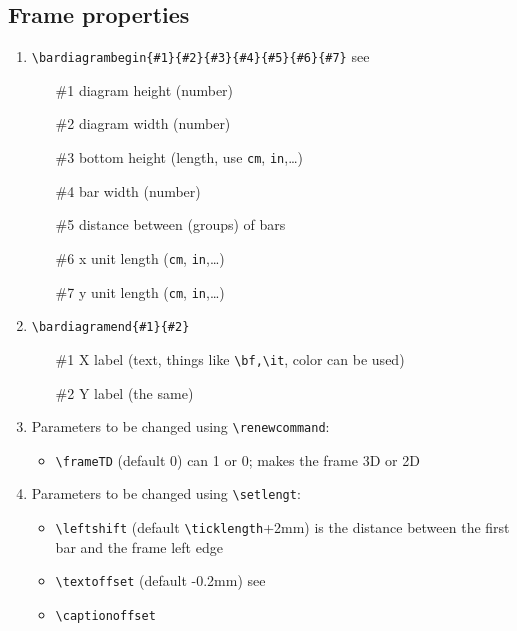 \documentclass[12pt]{article}
\begin{document}
\subsection{Frame properties \label{sec:3.1}}
\begin{enumerate}
\item \verb+\bardiagrambegin{#1}{#2}{#3}{#4}{#5}{#6}{#7}+ 
      see 
   \begin{itemize}
       \item[\#1] diagram height (number)
       \item[\#2] diagram width (number)
       \item[\#3] bottom height (length, use \texttt{cm},
                  \texttt{in},\ldots)
       \item[\#4] bar width (number)
       \item[\#5] distance between (groups) of bars
       \item[\#6] x unit length (\texttt{cm},
                  \texttt{in},\ldots)
       \item[\#7] y unit length (\texttt{cm},
                  \texttt{in},\ldots)
   \end{itemize}    
\item \verb+\bardiagramend{#1}{#2}+ 
   \begin{itemize}
       \item[\#1] X label (text, things like \verb+\bf,\it+, color can
         be used)
       \item[\#2] Y label (the same)
   \end{itemize} 
\item Parameters to be changed using \verb+\renewcommand+:
  \begin{itemize}    
     \item   \verb+\frameTD+ 
       (default 0) can 1 or 0; makes the frame
       3D or 2D
  \end{itemize}
\item Parameters to be changed using \verb+\setlengt+:
   \begin{itemize}
     \item \verb+\leftshift+ 
       (default \verb+\ticklength++2mm) is the
       distance between the first bar and the frame left edge
     \item \verb+\textoffset+  
       (default -0.2mm) see 
     \item \verb+\captionoffset+ 

\end{itemize}
\end{enumerate}
\end{document}
